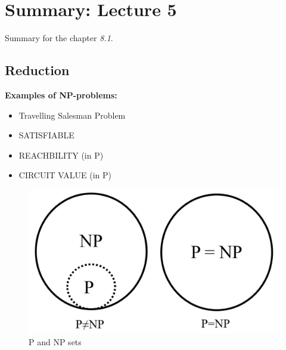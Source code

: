 \documentclass[a4]{scrartcl}
\begin{document}
\section*{Summary: Lecture 5}

Summary for the chapter \textit{8.1}. \cite{book}










\subsection*{Reduction}


\begin{minipage}{0.56\textwidth}
\textbf{Examples of NP-problems:}
\begin{itemize}
\item Travelling Salesman Problem
\item SATISFIABLE
\item REACHBILITY (in P)
\item CIRCUIT VALUE (in P)
\end{itemize}

\end{minipage}\begin{minipage}{0.4\textwidth}

\begin{figure}[H]
\includegraphics[scale=0.2]{PNP.jpg}
\caption{P and NP sets \cite{PNPsets}}
\end{figure}

\end{minipage}
\end{document}
